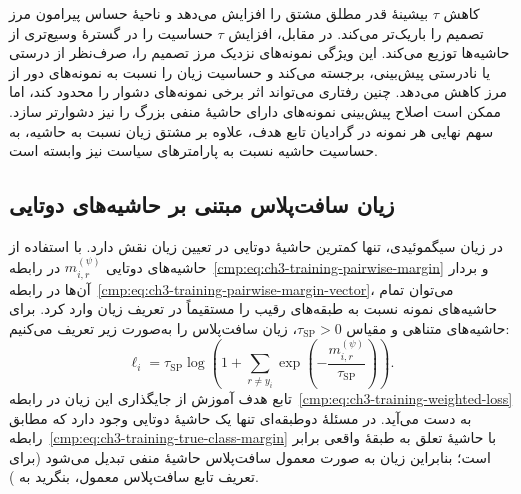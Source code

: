 کاهش $\tau$ بیشینهٔ قدر مطلق مشتق را افزایش
می‌دهد و ناحیهٔ حساس پیرامون مرز تصمیم را
باریک‌تر می‌کند. در مقابل، افزایش $\tau$
حساسیت را در گسترهٔ وسیع‌تری از حاشیه‌ها
توزیع می‌کند. این ویژگی نمونه‌های نزدیک مرز
تصمیم را، صرف‌نظر از درستی یا نادرستی پیش‌بینی،
برجسته می‌کند و حساسیت زیان را نسبت به نمونه‌های
دور از مرز کاهش می‌دهد. چنین رفتاری می‌تواند
اثر برخی نمونه‌های دشوار را محدود کند، اما
ممکن است اصلاح پیش‌بینی نمونه‌های دارای حاشیهٔ
منفی بزرگ را نیز دشوارتر سازد.
سهم نهایی هر نمونه در گرادیان تابع هدف، علاوه بر
مشتق زیان نسبت به حاشیه، به حساسیت حاشیه نسبت به
پارامترهای سیاست نیز وابسته است.

\subsection{زیان سافت‌پلاس مبتنی بر حاشیه‌های دوتایی}
\label{cmp:subsec:ch3-training-softplus-loss}

در زیان سیگموئیدی، تنها کمترین حاشیهٔ دوتایی
در تعیین زیان نقش دارد. با استفاده از حاشیه‌های دوتایی $m_{i,r}^{(\psi)}$
در رابطه~\eqref{cmp:eq:ch3-training-pairwise-margin}
و بردار آن‌ها در
رابطه~\eqref{cmp:eq:ch3-training-pairwise-margin-vector}،
می‌توان تمام حاشیه‌های نمونه نسبت به طبقه‌های رقیب
را مستقیماً در تعریف زیان وارد کرد.
برای حاشیه‌های متناهی و مقیاس $\tau_{\mathrm{SP}}>0$،
زیان سافت‌پلاس را به‌صورت زیر تعریف می‌کنیم:
\begin{equation}\label{cmp:eq:ch3-training-softplus-sample}
\boxed{
\ell_i=
\tau_{\mathrm{SP}}\log\left(
1+\sum_{r\ne y_i}
\exp\left(-\frac{m_{i,r}^{(\psi)}}{\tau_{\mathrm{SP}}}\right)
\right).
}
\end{equation}
تابع هدف آموزش از جایگذاری این زیان در
رابطه~\eqref{cmp:eq:ch3-training-weighted-loss}
به دست می‌آید.
در مسئلهٔ دوطبقه‌ای تنها یک حاشیهٔ دوتایی وجود
دارد که مطابق
رابطه~\eqref{cmp:eq:ch3-training-true-class-margin}
با حاشیهٔ تعلق به طبقهٔ واقعی برابر است؛
بنابراین زیان به صورت معمول سافت‌پلاس
حاشیهٔ منفی تبدیل می‌شود (برای تعریف تابع سافت‌پلاس معمول، بنگرید به \cite{GoodfellowBengioCourville2016DeepLearning}).


